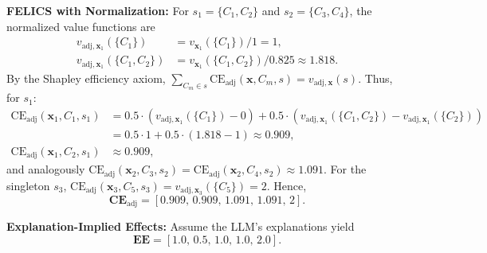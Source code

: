 \begin{example_box}[label=ex:payout_normalization_correlation]
	\smallskip
	\textbf{FELICS with Normalization:} For $s_1 = \{C_1, C_2\}$ and $s_2 = \{C_3, C_4\}$, the normalized value functions are
	\begin{align*}
		v_{\mathrm{adj},\mathbf{x}_1}(\{C_1\})      & = v_{\mathbf{x}_1}(\{C_1\}) / 1 = 1,                    \\
		v_{\mathrm{adj},\mathbf{x}_1}(\{C_1, C_2\}) & = v_{\mathbf{x}_1}(\{C_1, C_2\}) / 0.825 \approx 1.818.
	\end{align*}
	By the Shapley efficiency axiom, $\sum_{C_m \in s} \mathrm{CE}_{\text{adj}}(\mathbf{x}, C_m, s) = v_{\mathrm{adj},\mathbf{x}}(s)$. Thus, for $s_1$:
	\begin{align*}
		\mathrm{CE}_{\text{adj}}(\mathbf{x}_1, C_1, s_1) & = 0.5 \cdot (v_{\mathrm{adj},\mathbf{x}_1}(\{C_1\}) - 0) + 0.5 \cdot (v_{\mathrm{adj},\mathbf{x}_1}(\{C_1, C_2\}) - v_{\mathrm{adj},\mathbf{x}_1}(\{C_2\})) \\
		                                                 & = 0.5 \cdot 1 + 0.5 \cdot (1.818 - 1) \approx 0.909,                                                                                                        \\
		\mathrm{CE}_{\text{adj}}(\mathbf{x}_1, C_2, s_1) & \approx 0.909,
	\end{align*}
	and analogously $\mathrm{CE}_{\text{adj}}(\mathbf{x}_2, C_3, s_2) = \mathrm{CE}_{\text{adj}}(\mathbf{x}_2, C_4, s_2) \approx 1.091$. For the singleton $s_3$, $\mathrm{CE}_{\text{adj}}(\mathbf{x}_3, C_5, s_3) = v_{\mathrm{adj},\mathbf{x}_3}(\{C_5\}) = 2$. Hence,
	\begin{equation*}
		\mathbf{CE}_{\text{adj}} = \left[0.909,\, 0.909,\, 1.091,\, 1.091,\, 2\right].
	\end{equation*}

	\smallskip
	\textbf{Explanation-Implied Effects:} Assume the LLM’s explanations yield
	\begin{equation*}
		\mathbf{EE} = \left[1.0,\, 0.5,\, 1.0,\, 1.0,\, 2.0\right].
	\end{equation*}


\end{example_box}
